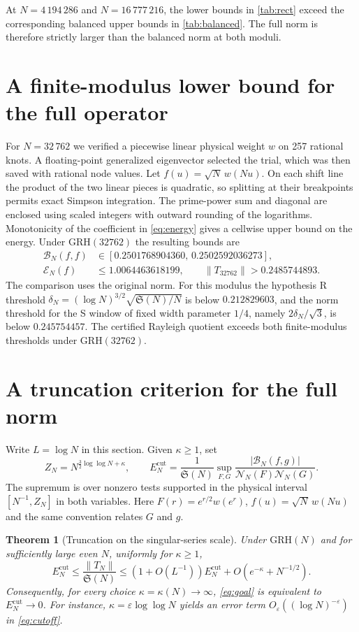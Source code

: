 \documentclass[11pt,a4paper]{article}
\numberwithin{equation}{section}
\newtheorem{theorem}{Theorem}[section]
\newcommand{\SSS}{\mathfrak S}
\newcommand{\grh}{\mathrm{GRH}}
\newcommand{\E}{\mathcal E_N}
\newcommand{\B}{\mathcal B_N}
\newcommand{\NN}{\mathcal N_N}
\begin{document}
At $N=4\,194\,286$ and $N=16\,777\,216$, the lower bounds in
\cref{tab:rect} exceed the corresponding balanced upper bounds in
\cref{tab:balanced}. The full norm is therefore strictly larger
than the balanced norm at both moduli.

\section{A finite-modulus lower bound for the full operator}
\label{sec:witness}

For $N=32\,762$ we verified a piecewise linear physical weight $w$
on 257 rational knots. A floating-point generalized eigenvector
selected the trial, which was then saved with rational node values.
Let $f(u)=\sqrt N\,w(Nu)$. On each shift line the product
of the two linear pieces is quadratic, so splitting at their
breakpoints permits exact Simpson integration. The prime-power sum
and diagonal are enclosed using scaled integers with outward
rounding of the logarithms. Monotonicity of the coefficient in
\cref{eq:energy} gives a cellwise upper bound on the energy.
Under $\grh(32762)$ the resulting bounds are
\begin{align*}
  \B(f,f)&\in[0.2501768904360,\,0.2502592036273],\\
  \E(f)&\le 1.0064463618199,
  \qquad \|T_{32762}\|>0.2485744893 .
\end{align*}
The comparison uses the original norm. For this modulus the hypothesis
R threshold
$\delta_N=(\log N)^{3/2}\sqrt{\SSS(N)/N}$ is below $0.212829603$,
and the norm threshold for the S window of fixed width parameter
$1/4$, namely $2\delta_N/\sqrt3$, is below $0.245754457$.
The certified Rayleigh quotient exceeds both finite-modulus thresholds
under $\grh(32762)$.

\section{A truncation criterion for the full norm}
\label{sec:cutoff}

Write $L=\log N$ in this section. Given $\kappa\ge1$, set
\[
  Z_N=N^{\frac32\log\log N+\kappa},
  \qquad
  E_N^{\mathrm{cut}}
   =\frac{1}{\SSS(N)}
      \sup_{F,G}
      \frac{|\B(f,g)|}{\NN(F)\NN(G)}.
\]
The supremum is over nonzero tests supported in the physical interval
$[N^{-1},Z_N]$ in both variables. Here $F(r)=e^{r/2}w(e^r)$,
$f(u)=\sqrt N\,w(Nu)$ and the same convention relates $G$ and $g$.

\begin{theorem}[Truncation on the singular-series scale]
\label{thm:cutoff}
Under $\grh(N)$ and for sufficiently large even $N$, uniformly
for $\kappa\ge1$,
\begin{equation}
 E_N^{\mathrm{cut}}\le\frac{\|T_N\|}{\SSS(N)}
 \le (1+O(L^{-1})) E_N^{\mathrm{cut}}+O(e^{-\kappa}+N^{-1/2}).
 \label{eq:cutoff}
\end{equation}
Consequently, for every choice $\kappa=\kappa(N)\to\infty$,
\cref{eq:goal} is equivalent to $E_N^{\mathrm{cut}}\to0$.
For instance, $\kappa=\varepsilon\log\log N$ yields an error term
$O_\varepsilon((\log N)^{-\varepsilon})$ in \cref{eq:cutoff}.
\end{theorem}
\end{document}
